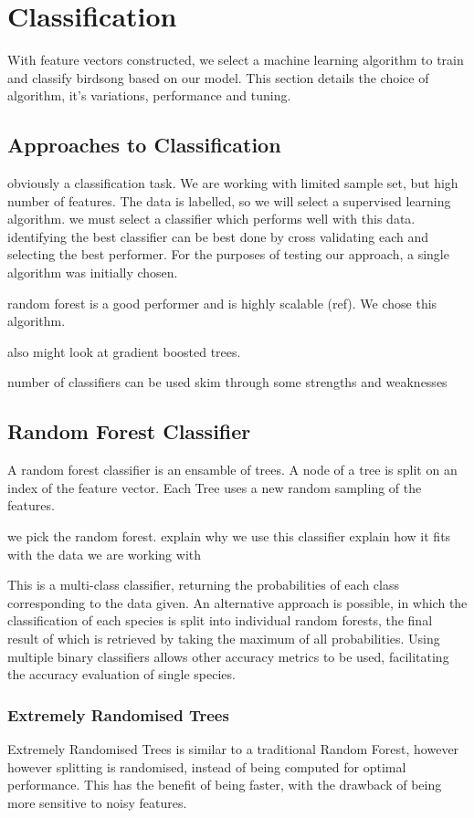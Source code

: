 \section{Classification}
With feature vectors constructed, we select a machine learning algorithm to
train and classify birdsong based on our model.
This section details the choice of algorithm, it's variations, performance and
tuning.

\subsection{Approaches to Classification}
obviously a classification task.
We are working with limited sample set, but high number of features.
The data is labelled, so we will select a supervised learning algorithm.
we must select a classifier which performs well with this data.
identifying the best classifier can be best done by cross validating each and
selecting the best performer.
For the purposes of testing our approach, a single algorithm was initially
chosen.

random forest is a good performer and is highly scalable (ref).
We chose this algorithm.

also might look at gradient boosted trees.

number of classifiers can be used
skim through some strengths and weaknesses

\subsection{Random Forest Classifier}
A random forest classifier is an ensamble of trees.
A node of a tree is split on an index of the feature vector.
Each Tree uses a new random sampling of the features.

we pick the random forest.
explain why we use this classifier
explain how it fits with the data we are working with

This is a multi-class classifier, returning the probabilities of each class
corresponding to the data given.
An alternative approach is possible, in which the classification of each species
is split into individual random forests, the final result of which is retrieved
by taking the maximum of all probabilities.
Using multiple binary classifiers allows other accuracy metrics to be used,
facilitating the accuracy evaluation of single species.

\subsubsection{Extremely Randomised Trees}
Extremely Randomised Trees is similar to a traditional Random Forest, however
however splitting is randomised, instead of being computed for optimal
performance.
This has the benefit of being faster, with the drawback of being more sensitive
to noisy features.\\

